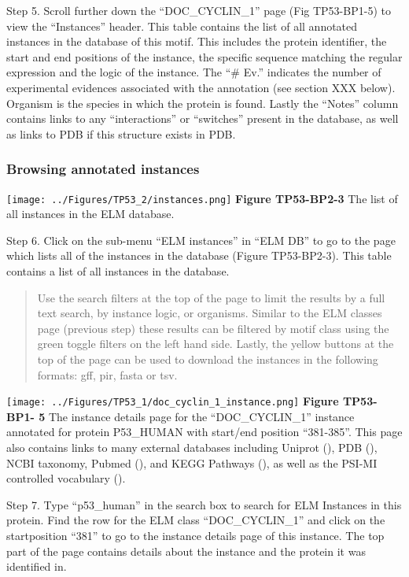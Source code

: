 Step 5. Scroll further down the ``DOC\_CYCLIN\_1'' page (Fig TP53-BP1-5)
to view the ``Instances'' header. This table contains the list of all
annotated instances in the database of this motif. This includes the
protein identifier, the start and end positions of the instance, the
specific sequence matching the regular expression and the logic of the
instance. The ``\# Ev.'' indicates the number of experimental evidences
associated with the annotation (see section XXX below). Organism is the
species in which the protein is found. Lastly the ``Notes'' column
contains links to any ``interactions'' or ``switches'' present in the
database, as well as links to PDB if this structure exists in PDB.

\subsubsection{Browsing annotated
instances}\label{browsing-annotated-instances}

\texttt{[image: ../Figures/TP53\_2/instances.png]} \textbf{Figure
TP53-BP2-3} The list of all instances in the ELM database.

Step 6. Click on the sub-menu ``ELM instances'' in ``ELM DB'' to go to
the page which lists all of the instances in the database (Figure
TP53-BP2-3). This table contains a list of all instances in the
database.

\begin{quote}
Use the search filters at the top of the page to limit the results by a
full text search, by instance logic, or organisms. Similar to the ELM
classes page (previous step) these results can be filtered by motif
class using the green toggle filters on the left hand side. Lastly, the
yellow buttons at the top of the page can be used to download the
instances in the following formats: gff, pir, fasta or tsv.
\end{quote}

\texttt{[image: ../Figures/TP53\_1/doc\_cyclin\_1\_instance.png]}
\textbf{Figure TP53-BP1- 5} The instance details page for the
``DOC\_CYCLIN\_1'' instance annotated for protein P53\_HUMAN with
start/end position ``381-385''. This page also contains links to many
external databases including Uniprot (\cite{25348405}), PDB
(\cite{12037327}), NCBI taxonomy, Pubmed (\cite{27899561}), and KEGG
Pathways (\cite{26476454}), as well as the PSI-MI controlled vocabulary
(\cite{17925023}).

Step 7. Type ``p53\_human'' in the search box to search for ELM
Instances in this protein. Find the row for the ELM class
``DOC\_CYCLIN\_1'' and click on the startposition ``381'' to go to the
instance details page of this instance. The top part of the page
contains details about the instance and the protein it was identified
in.


